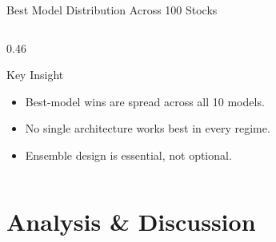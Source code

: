 \documentclass[aspectratio=43,11pt]{beamer}
\begin{document}
\begin{frame}{Best Model Distribution Across 100 Stocks}
\begin{columns}[T]
\begin{column}{0.46\textwidth}
\begin{center}
            \end{center}
            \begin{exampleblock}{Key Insight}
                \footnotesize
                \begin{itemize}\setlength{\itemsep}{1pt}
                    \item Best-model wins are spread across all 10 models.
                    \item No single architecture works best in every regime.
                    \item Ensemble design is essential, not optional.
                \end{itemize}
            \end{exampleblock}
        \end{column}
    \end{columns}
\end{frame}

\section{Analysis \& Discussion}
\end{document}
